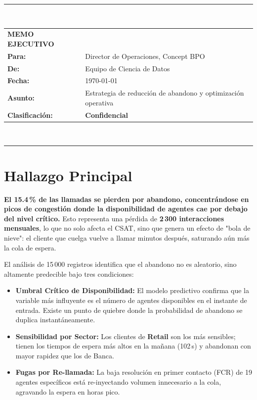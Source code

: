 \documentclass[10pt,a4paper]{article}
\begin{document}
\thispagestyle{fancy}

{\color{cbpoBlue}
\noindent\rule{\linewidth}{2pt}\\[4pt]
\begin{tabularx}{\linewidth}{@{}lX@{}}
  \textbf{\textsf{\Large MEMO EJECUTIVO}} & \\[4pt]
  \textsf{\textbf{Para:}}          & Director de Operaciones, Concept BPO \\
  \textsf{\textbf{De:}}            & Equipo de Ciencia de Datos \\
  \textsf{\textbf{Fecha:}}         & \today \\
  \textsf{\textbf{Asunto:}}        & Estrategia de reducción de abandono y optimización operativa \\
  \textsf{\textbf{Clasificación:}} & \textcolor{cbpoRed}{\textbf{Confidencial}} \\
\end{tabularx}\\[4pt]
\noindent\rule{\linewidth}{2pt}
}

\section{Hallazgo Principal}

\begin{hallazgobox}
\textbf{El 15.4\,\% de las llamadas se pierden por abandono, concentrándose en picos de congestión donde la disponibilidad de agentes cae por debajo del nivel crítico.}
Esto representa una pérdida de \textbf{2\,300 interacciones mensuales}, lo que no solo afecta el CSAT, sino que genera un efecto de "bola de nieve": el cliente que cuelga vuelve a llamar minutos después, saturando aún más la cola de espera.
\end{hallazgobox}

El análisis de 15\,000 registros identifica que el abandono no es aleatorio, sino altamente predecible bajo tres condiciones:
\begin{itemize}[leftmargin=1.4em,itemsep=1pt]
  \item \textbf{Umbral Crítico de Disponibilidad:} El modelo predictivo confirma que la variable más influyente es el número de agentes disponibles en el instante de entrada. Existe un punto de quiebre donde la probabilidad de abandono se duplica instantáneamente.
  \item \textbf{Sensibilidad por Sector:} Los clientes de \textbf{Retail} son los más sensibles; tienen los tiempos de espera más altos en la mañana (102\,s) y abandonan con mayor rapidez que los de Banca.
  \item \textbf{Fugas por Re-llamada:} La baja resolución en primer contacto (FCR) de 19 agentes específicos está re-inyectando volumen innecesario a la cola, agravando la espera en horas pico.
\end{itemize}
\end{document}

